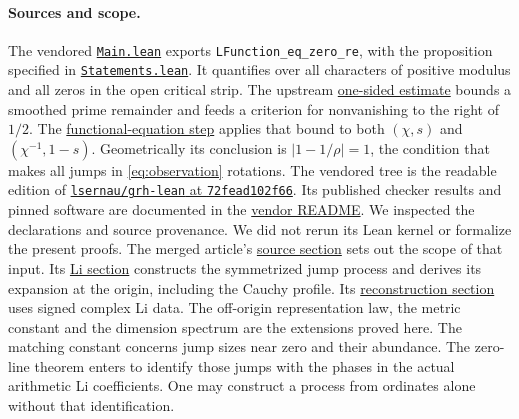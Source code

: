\documentclass[11pt]{article}
\theoremstyle{remark}\newtheorem{remark}[theorem]{Remark}
\newcommand{\pinned}[2]{\href{https://github.com/VladimirReshetnikov/ProveIt/blob/b6253012cf30c80a989c871906e097a27f23a27c/Analysis/GeneralizedRiemannHypothesis/#1}{#2}}
\begin{document}
\paragraph{Sources and scope.}
The vendored \pinned{vendor/grh-lean/grh/src/Main.lean}{\texttt{Main.lean}}
exports \texttt{LFunction\_eq\_zero\_re}, with the proposition specified in
\pinned{vendor/grh-lean/grh/src/Statements.lean}{\texttt{Statements.lean}}.
It quantifies over all characters of positive modulus and all zeros in the
open critical strip. The upstream
\pinned{vendor/grh-lean/grh/src/New/Reduction/OneSidedBound.lean}{one-sided estimate}
bounds a smoothed prime remainder and feeds a criterion for nonvanishing
to the right of $1/2$. The
\pinned{vendor/grh-lean/grh/src/New/Main.lean}{functional-equation step}
applies that bound to both $(\chi,s)$ and $(\chi^{-1},1-s)$.
Geometrically its conclusion is $|1-1/\rho|=1$, the condition that makes
all jumps in \eqref{eq:observation} rotations. The vendored tree is the readable edition of
\href{https://github.com/lsernau/grh-lean/tree/72fead102f663d5c7a407964a13dc0cf9d977207/grh}{\texttt{lsernau/grh-lean} at \texttt{72fead102f66}}.
Its published checker results and pinned software are documented in the
\pinned{vendor/grh-lean/grh/README.md}{vendor README}.
We inspected the declarations and source provenance.
We did not rerun its Lean kernel or formalize the present proofs.
The merged article's
\pinned{Article/sections/src.tex}{source section} sets out the scope of that input.
Its \pinned{Article/sections/li.tex}{Li section} constructs the symmetrized
jump process and derives its expansion at the origin, including the Cauchy
profile. Its \pinned{Article/sections/rec.tex}{reconstruction section}
uses signed complex Li data. The off-origin representation law, the metric
constant and the dimension spectrum are the extensions proved here.
The matching constant concerns jump sizes near zero and their abundance.
The zero-line theorem enters to identify those jumps with the phases in
the actual arithmetic Li coefficients. One may construct a process from
ordinates alone without that identification.
\end{document}

